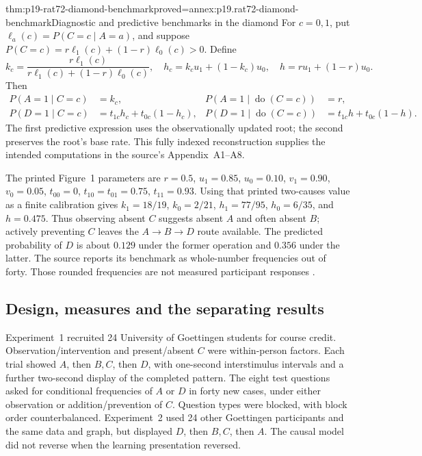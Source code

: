 \begin{hbtheorem}{thm:p19-rat72-diamond-benchmark}{proved=annex:p19.rat72-diamond-benchmark}{Diagnostic and predictive benchmarks in the diamond}
For \(c=0,1\), put \(\ell_a(c)=P(C=c\mid A=a)\), and suppose
\(P(C=c)=r\ell_1(c)+(1-r)\ell_0(c)>0\). Define
\[
 k_c=\frac{r\ell_1(c)}{r\ell_1(c)+(1-r)\ell_0(c)},\quad
 h_c=k_cu_1+(1-k_c)u_0,\quad h=ru_1+(1-r)u_0.
\]
Then
\[
\begin{aligned}
 P(A=1\mid C=c)&=k_c,&
 P(A=1\mid\operatorname{do}(C=c))&=r,\\
 P(D=1\mid C=c)&=t_{1c}h_c+t_{0c}(1-h_c),&
 P(D=1\mid\operatorname{do}(C=c))&=t_{1c}h+t_{0c}(1-h).
\end{aligned}
\]
The first predictive expression uses the observationally updated root;
the second preserves the root's base rate. This fully indexed
reconstruction supplies the intended computations in the source's
Appendix~A1--A8.
\end{hbtheorem}

The printed Figure~1 parameters are \(r=0.5\), \(u_1=0.85\),
\(u_0=0.10\), \(v_1=0.90\), \(v_0=0.05\),
\(t_{00}=0\), \(t_{10}=t_{01}=0.75\), \(t_{11}=0.93\).
Using that printed two-causes value as a finite calibration gives
\(k_1=18/19\), \(k_0=2/21\), \(h_1=77/95\),
\(h_0=6/35\), and \(h=0.475\). Thus observing absent \(C\)
suggests absent \(A\) and often absent \(B\); actively preventing
\(C\) leaves the \(A\to B\to D\) route available. The predicted
probability of \(D\) is about \(0.129\) under the former operation
and \(0.356\) under the latter. The source reports its benchmark
as whole-number frequencies out of forty. Those rounded frequencies
are not measured participant responses
\cite[Fig.~1, Tables~1--2 and Appendix, pp.~76--80]
{MederHagmayerWaldmann2008Interventional}.

\subsection{Design, measures and the separating results}

Experiment~1 recruited 24 University of Goettingen students for course
credit. Observation/intervention and present/absent \(C\) were
within-person factors. Each trial showed \(A\), then \(B,C\), then
\(D\), with one-second interstimulus intervals and a further two-second
display of the completed pattern. The eight test questions asked for
conditional frequencies of \(A\) or \(D\) in forty new cases, under
either observation or addition/prevention of \(C\). Question types
were blocked, with block order counterbalanced. Experiment~2 used
24 other Goettingen participants and the same data and graph, but
displayed \(D\), then \(B,C\), then \(A\). The causal model did not
reverse when the learning presentation reversed.


